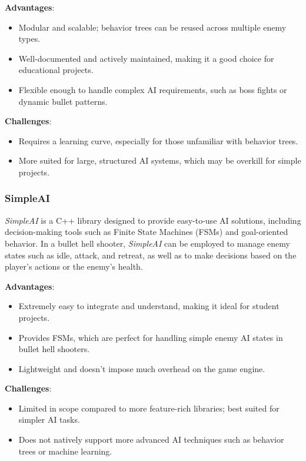 \textbf{Advantages}:
\begin{itemize}
    \item Modular and scalable; behavior trees can be reused across multiple enemy types.
    \item Well-documented and actively maintained, making it a good choice for educational projects.
    \item Flexible enough to handle complex AI requirements, such as boss fights or dynamic bullet patterns.
\end{itemize}

\textbf{Challenges}:
\begin{itemize}
    \item Requires a learning curve, especially for those unfamiliar with behavior trees.
    \item More suited for large, structured AI systems, which may be overkill for simple projects.
\end{itemize}

\subsubsection{SimpleAI}

\textit{SimpleAI} is a C++ library designed to provide easy-to-use AI solutions, including decision-making tools such as Finite State Machines (FSMs) and goal-oriented behavior. In a bullet hell shooter, \textit{SimpleAI} can be employed to manage enemy states such as idle, attack, and retreat, as well as to make decisions based on the player's actions or the enemy’s health.

\textbf{Advantages}:
\begin{itemize}
    \item Extremely easy to integrate and understand, making it ideal for student projects.
    \item Provides FSMs, which are perfect for handling simple enemy AI states in bullet hell shooters.
    \item Lightweight and doesn’t impose much overhead on the game engine.
\end{itemize}

\textbf{Challenges}:
\begin{itemize}
    \item Limited in scope compared to more feature-rich libraries; best suited for simpler AI tasks.
    \item Does not natively support more advanced AI techniques such as behavior trees or machine learning.
\end{itemize}

